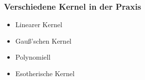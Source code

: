 	
	\begin{frame}
		\frametitle{Verschiedene Kernel in der Praxis}
			\begin{itemize}
				\item Linearer Kernel \\
				\item Gauß'schen Kernel \\
				\item Polynomiell \\
				\item Esotherische Kernel \\
			\end{itemize}
	\end{frame}

